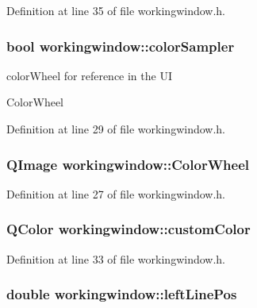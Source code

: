 Definition at line 35 of file workingwindow.\-h.

\hypertarget{classworkingwindow_ab1e5dc3b626cb9e28983e6abee34d10d}{
\subsubsection[{color\-Sampler}]{\setlength{\rightskip}{0pt plus 5cm}bool workingwindow\-::color\-Sampler}}\label{classworkingwindow_ab1e5dc3b626cb9e28983e6abee34d10d}


color\-Wheel for reference in the U\-I 

Color\-Wheel 

Definition at line 29 of file workingwindow.\-h.

\hypertarget{classworkingwindow_ab9ed1f2dafd42f388fc7b366d25db626}{
\subsubsection[{Color\-Wheel}]{\setlength{\rightskip}{0pt plus 5cm}Q\-Image workingwindow\-::\-Color\-Wheel}}\label{classworkingwindow_ab9ed1f2dafd42f388fc7b366d25db626}


Definition at line 27 of file workingwindow.\-h.

\hypertarget{classworkingwindow_a44fa7af5c036e2686e55c31a3b69e81f}{
\subsubsection[{custom\-Color}]{\setlength{\rightskip}{0pt plus 5cm}Q\-Color workingwindow\-::custom\-Color}}\label{classworkingwindow_a44fa7af5c036e2686e55c31a3b69e81f}


Definition at line 33 of file workingwindow.\-h.

\hypertarget{classworkingwindow_a9e3b2de905cba0520347811c530958da}{
\subsubsection[{left\-Line\-Pos}]{\setlength{\rightskip}{0pt plus 5cm}double workingwindow\-::left\-Line\-Pos}}\label{classworkingwindow_a9e3b2de905cba0520347811c530958da}


